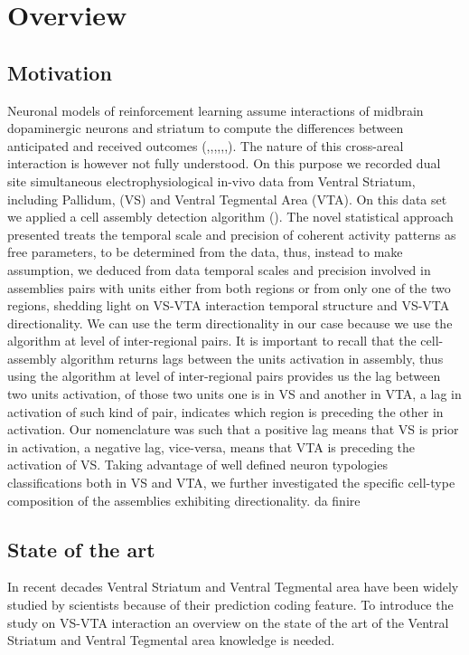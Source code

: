 \chapter{Overview}
\label{chap:Overview}
\section{Motivation}
\label{sec:Motivation}
Neuronal models of reinforcement learning assume interactions of midbrain dopaminergic neurons and striatum to compute the differences between anticipated and received outcomes (\cite{Schultz},\cite{Schultz1992},\cite{Schultz1995},\cite{Schultz1998},\cite{Schultz2001},\cite{Schultz2002},\cite{Fiorillo}). The nature of this cross-areal interaction is however not fully understood. On this purpose we recorded dual site simultaneous electrophysiological in-vivo data from Ventral Striatum, including Pallidum, (VS) and Ventral Tegmental Area (VTA). On this data set we applied a cell assembly detection algorithm (\cite{RussoDurstewitz}).
The novel statistical approach presented treats the temporal scale and precision of coherent activity patterns as free parameters, to be determined from the data, thus, instead to make assumption, we deduced from data temporal scales and precision involved in assemblies pairs with units either from both regions or from only one of the two regions, shedding light on VS-VTA interaction temporal structure and VS-VTA directionality.
We can use the term directionality in our case because we use the algorithm at level of inter-regional pairs. It is important to recall that the cell-assembly algorithm returns lags between the units activation in assembly, thus using the algorithm at level of inter-regional pairs provides us the lag between two units activation, of those two units one is in VS and another in VTA, a lag in activation of such kind of pair, indicates which region is preceding the other in activation.
Our nomenclature was such that a positive lag means that VS is prior in activation, a negative lag, vice-versa, means that VTA is preceding the activation of VS.
Taking advantage of well defined neuron typologies classifications both in VS and VTA, we further investigated the specific cell-type composition of the assemblies exhibiting directionality. 
{\color{red}da finire}
\section{State of the art}
\label{sec:StateArt}
 In recent decades Ventral Striatum and Ventral Tegmental area have been widely studied by scientists because of their prediction coding feature.
 To introduce the study on VS-VTA interaction an overview on the state of the art of the Ventral Striatum and Ventral Tegmental area knowledge is needed.
